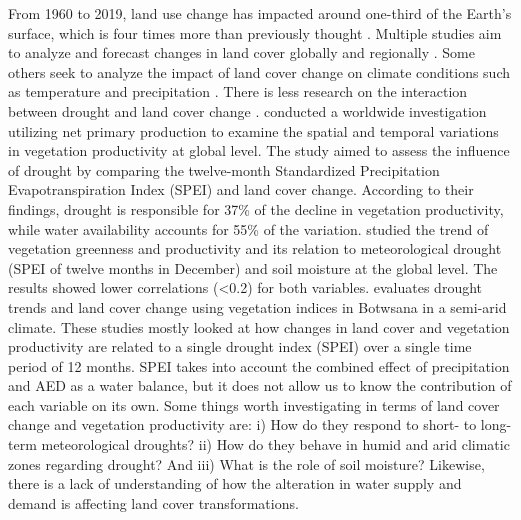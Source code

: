 \documentclass[
  authoryear,
  preprint,
  3p,
  onecolumn]{elsarticle}
\begin{document}
From 1960 to 2019, land use change has impacted around one-third of the
Earth's surface, which is four times more than previously thought
\citep{Winkler2021}. Multiple studies aim to analyze and forecast
changes in land cover globally \citep{Winkler2021, Song2018} and
regionally \citep{Chamling2020, Homer2020, Yang2021}. Some others seek
to analyze the impact of land cover change on climate conditions such as
temperature and precipitation \citep{Luyssaert2014, Pitman2012}. There
is less research on the interaction between drought and land cover
change \citep{Chen2022, Akinyemi2021, Peng2017}. \citet{Peng2017}
conducted a worldwide investigation utilizing net primary production to
examine the spatial and temporal variations in vegetation productivity
at global level. The study aimed to assess the influence of drought by
comparing the twelve-month Standardized Precipitation Evapotranspiration
Index (SPEI) and land cover change. According to their findings, drought
is responsible for 37\% of the decline in vegetation productivity, while
water availability accounts for 55\% of the variation. \citet{Chen2022}
studied the trend of vegetation greenness and productivity and its
relation to meteorological drought (SPEI of twelve months in December)
and soil moisture at the global level. The results showed lower
correlations (\textless0.2) for both variables. \citet{Akinyemi2021}
evaluates drought trends and land cover change using vegetation indices
in Botwsana in a semi-arid climate. These studies mostly looked at how
changes in land cover and vegetation productivity are related to a
single drought index (SPEI) over a single time period of 12 months. SPEI
takes into account the combined effect of precipitation and AED as a
water balance, but it does not allow us to know the contribution of each
variable on its own. Some things worth investigating in terms of land
cover change and vegetation productivity are: i) How do they respond to
short- to long-term meteorological droughts? ii) How do they behave in
humid and arid climatic zones regarding drought? And iii) What is the
role of soil moisture? Likewise, there is a lack of understanding of how
the alteration in water supply and demand is affecting land cover
transformations.
\end{document}
